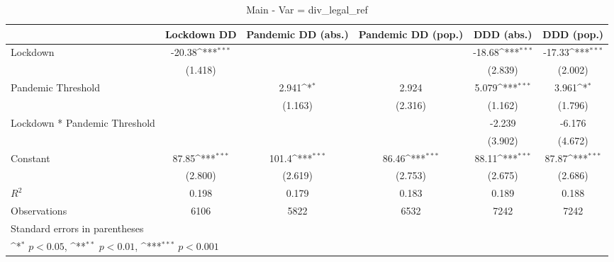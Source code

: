 \documentclass{article}
\begin{document}
{
\def\sym#1{\ifmmode^{#1}\else\(^{#1}\)\fi}
\begin{longtable}{l*{5}{c}}
\caption{Main - Var = div\_legal\_ref}\\
\hline\hline\endfirsthead\hline\endhead\hline\endfoot\endlastfoot
                &\multicolumn{1}{c}{Lockdown DD}&\multicolumn{1}{c}{Pandemic DD (abs.)}&\multicolumn{1}{c}{Pandemic DD (pop.)}&\multicolumn{1}{c}{DDD (abs.)}&\multicolumn{1}{c}{DDD (pop.)}\\
\hline
Lockdown        &   -20.38\sym{***}&                  &                  &   -18.68\sym{***}&   -17.33\sym{***}\\
                &  (1.418)         &                  &                  &  (2.839)         &  (2.002)         \\
Pandemic Threshold&                  &    2.941\sym{*}  &    2.924         &    5.079\sym{***}&    3.961\sym{*}  \\
                &                  &  (1.163)         &  (2.316)         &  (1.162)         &  (1.796)         \\
Lockdown * Pandemic Threshold&                  &                  &                  &   -2.239         &   -6.176         \\
                &                  &                  &                  &  (3.902)         &  (4.672)         \\
Constant        &    87.85\sym{***}&    101.4\sym{***}&    86.46\sym{***}&    88.11\sym{***}&    87.87\sym{***}\\
                &  (2.800)         &  (2.619)         &  (2.753)         &  (2.675)         &  (2.686)         \\
\hline
\(R^{2}\)       &    0.198         &    0.179         &    0.183         &    0.189         &    0.188         \\
Observations    &     6106         &     5822         &     6532         &     7242         &     7242         \\
\hline\hline
\multicolumn{6}{l}{\footnotesize Standard errors in parentheses}\\
\multicolumn{6}{l}{\footnotesize \sym{*} \(p<0.05\), \sym{**} \(p<0.01\), \sym{***} \(p<0.001\)}\\
\end{longtable}
}
\end{document}
